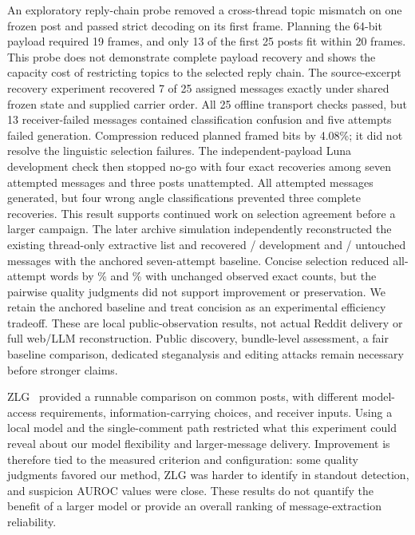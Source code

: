 An exploratory reply-chain probe removed a cross-thread topic mismatch on one frozen post and passed strict decoding on its first frame.
Planning the 64-bit payload required 19 frames, and only 13 of the first 25 posts fit within 20 frames.
This probe does not demonstrate complete payload recovery and shows the capacity cost of restricting topics to the selected reply chain.
The source-excerpt recovery experiment recovered 7 of 25 assigned messages exactly under shared frozen state and supplied carrier order. All 25 offline transport checks passed, but 13 receiver-failed messages contained classification confusion and five attempts failed generation. Compression reduced planned framed bits by 4.08\%; it did not resolve the linguistic selection failures.
The independent-payload Luna development check then stopped no-go with four exact recoveries among seven attempted messages and three posts unattempted. All attempted messages generated, but four wrong angle classifications prevented three complete recoveries. This result supports continued work on selection agreement before a larger campaign.
The later archive simulation independently reconstructed the existing thread-only extractive list and recovered \FreshDevSevenExact/\FreshAssigned{} development and \FreshHeldSevenExact/\FreshAssigned{} untouched messages with the anchored seven-attempt baseline. Concise selection reduced all-attempt words by \FreshDevSaving\% and \FreshHeldSaving\% with unchanged observed exact counts, but the pairwise quality judgments did not support improvement or preservation. We retain the anchored baseline and treat concision as an experimental efficiency tradeoff. These are local public-observation results, not actual Reddit delivery or full web/LLM reconstruction. Public discovery, bundle-level assessment, a fair baseline comparison, dedicated steganalysis and editing attacks remain necessary before stronger claims.

\label{par:baseline-interpretation}
ZLG~\cite{lin2024zero} provided a runnable comparison on common posts, with different model-access requirements, information-carrying choices, and receiver inputs. Using a local model and the single-comment path restricted what this experiment could reveal about our model flexibility and larger-message delivery. Improvement is therefore tied to the measured criterion and configuration: some quality judgments favored our method, ZLG was harder to identify in standout detection, and suspicion AUROC values were close. These results do not quantify the benefit of a larger model or provide an overall ranking of message-extraction reliability.

